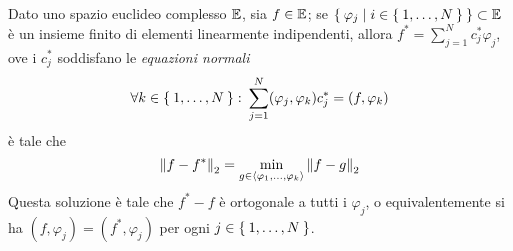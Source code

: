 	\begin{teorema}\label{th:proiez-ortog}
		Dato uno spazio euclideo complesso \(\mathbb{E}\), sia \(f \in \mathbb{E}\); se \(\Set{\varphi_j | i \in \Set{1, \dots, N}} \subset \mathbb{E}\) è un insieme finito di elementi linearmente indipendenti, allora \(f^* = \sum_{j = 1}^N c_j^* \varphi_j\), ove i \(c_j^* \!\) soddisfano le \emph{equazioni normali}
		\begin{equation}\label{eq:eq-normali}
			\forall k \in \Set{1, \dots, N} \colon \sum_{j = 1}^N (\varphi_j, \varphi_k) c_j^* = (f, \varphi_k)
		\end{equation}
		è tale che\label{eq:proiez-ortog}
		\begin{equation}
			\norm{f - f^*}_2 = \min_{g \in \Braket{\varphi_1, \dots, \varphi_k}} \norm{f - g}_2
		\end{equation}
		Questa soluzione è tale che \(f^* - f\) è ortogonale a tutti i \(\varphi_j\), o equivalentemente si ha \((f, \varphi_j) = (f^*, \varphi_j)\) per ogni \(j \in \Set{1, \dots, N}\).
	\end{teorema}

